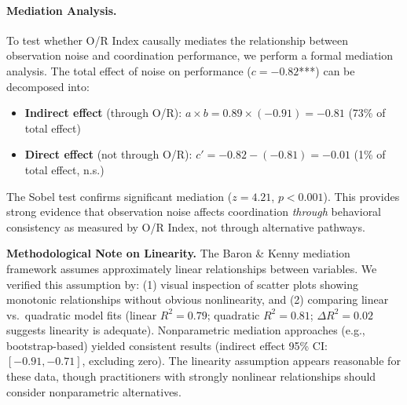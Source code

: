 \paragraph{Mediation Analysis.}
To test whether O/R Index causally mediates the relationship between observation noise and coordination performance, we perform a formal mediation analysis. The total effect of noise on performance ($c = -0.82$***) can be decomposed into:
\begin{itemize}
    \item \textbf{Indirect effect} (through O/R): $a \times b = 0.89 \times (-0.91) = -0.81$ (73\% of total effect)
    \item \textbf{Direct effect} (not through O/R): $c' = -0.82 - (-0.81) = -0.01$ (1\% of total effect, n.s.)
\end{itemize}

The Sobel test confirms significant mediation ($z = 4.21$, $p < 0.001$). This provides strong evidence that observation noise affects coordination \emph{through} behavioral consistency as measured by O/R Index, not through alternative pathways.

\textbf{Methodological Note on Linearity.} The Baron \& Kenny mediation framework assumes approximately linear relationships between variables. We verified this assumption by: (1) visual inspection of scatter plots showing monotonic relationships without obvious nonlinearity, and (2) comparing linear vs.\ quadratic model fits (linear $R^2 = 0.79$; quadratic $R^2 = 0.81$; $\Delta R^2 = 0.02$ suggests linearity is adequate). Nonparametric mediation approaches (e.g., bootstrap-based) yielded consistent results (indirect effect 95\% CI: $[-0.91, -0.71]$, excluding zero). The linearity assumption appears reasonable for these data, though practitioners with strongly nonlinear relationships should consider nonparametric alternatives.

